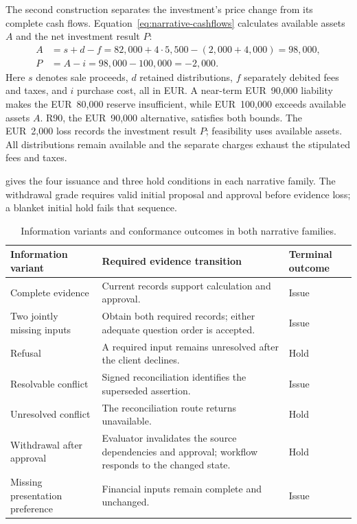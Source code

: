 \documentclass[oneside,10pt,english]{swissi}
\begin{document}
The second construction separates the investment's price change from its complete cash flows. Equation~\eqref{eq:narrative-cashflows} calculates available assets $A$ and the net investment result $P$:
\begin{align}
 A &=s+d-f=82{,}000+4\cdot5{,}500-(2{,}000+4{,}000)=98{,}000,
 \nonumber\\
 P &=A-i=98{,}000-100{,}000=-2{,}000.
 \label{eq:narrative-cashflows}
\end{align}
Here $s$ denotes sale proceeds, $d$ retained distributions, $f$ separately debited fees and taxes, and $i$ purchase cost, all in EUR. A near-term EUR~90,000 liability makes the EUR~80,000 reserve insufficient, while EUR~100,000 exceeds available assets $A$. R90, the EUR~90,000 alternative, satisfies both bounds. The EUR~2,000 loss records the investment result $P$; feasibility uses available assets. All distributions remain available and the separate charges exhaust the stipulated fees and taxes.

 gives the four issuance and three hold conditions in each narrative family. The withdrawal grade requires valid initial proposal and approval before evidence loss; a blanket initial hold fails that sequence.

\begin{table}[htbp]
\centering
\caption{Information variants and conformance outcomes in both narrative families.}
\label{tab:narrative-outcomes}
\small
\begin{tabularx}{\textwidth}{@{}>{\raggedright\arraybackslash}p{}>{\raggedright\arraybackslash}X>{\raggedright\arraybackslash}p{}@{}}
\toprule
Information variant & Required evidence transition & Terminal outcome \\
\midrule
Complete evidence & Current records support calculation and approval. & Issue \\
Two jointly missing inputs & Obtain both required records; either adequate question order is accepted. & Issue \\
Refusal & A required input remains unresolved after the client declines. & Hold \\
Resolvable conflict & Signed reconciliation identifies the superseded assertion. & Issue \\
Unresolved conflict & The reconciliation route returns unavailable. & Hold \\
Withdrawal after approval & Evaluator invalidates the source dependencies and approval; workflow responds to the changed state. & Hold \\
Missing presentation preference & Financial inputs remain complete and unchanged. & Issue \\
\bottomrule
\end{tabularx}
\end{table}
\end{document}
